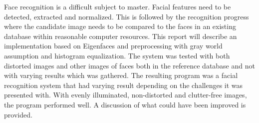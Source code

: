 Face recognition is a difficult subject to master. Facial features need to be detected, extracted and normalized. This is followed by the recognition progress where the candidate image needs to be compared to the faces in an existing database within reasonable computer resources. This report will describe an implementation based on Eigenfaces and preprocessing with gray world assumption and histogram equalization. The system was tested with both distorted images and other images of faces both in the reference database and not with varying results which was gathered.  The resulting program was a facial recognition system that had varying result depending on the challenges it was presented with. With evenly illuminated, non-distorted and clutter-free images, the program performed well. A discussion of what could have been improved is provided.

